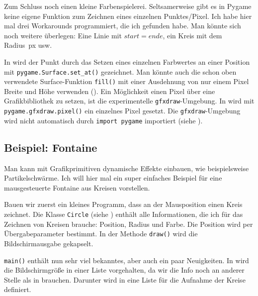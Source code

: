 Zum Schluss noch einen kleine Farbenspielerei. Seltsamerweise gibt es in Pygame keine eigene Funktion zum Zeichnen eines einzelnen Punktes/Pixel. Ich habe hier mal drei Workarounds programmiert, die ich gefunden habe. Man könnte sich noch weitere überlegen: Eine Linie mit $start=ende$, ein Kreis mit dem Radius~\unit[1]{px} usw.

In  wird der Punkt durch das Setzen eines einzelnen Farbwertes an einer Position mit \texttt{pygame.Surface.set\_at()} gezeichnet. Man könnte auch die schon oben verwendete Surface-Funktion \texttt{fill()} mit einer Ausdehnung von nur einem Pixel Breite und Höhe verwenden (). Ein Möglichkeit einen Pixel über eine Grafikbibliothek zu setzen, ist die experimentelle \texttt{gfxdraw}-Umgebung. In  wird mit \texttt{pygame.gfxdraw.pixel()} ein einzelnes Pixel gesetzt. Die \texttt{gfxdraw}-Umgebung wird nicht automatisch durch \texttt{import pygame} importiert (siehe ).

\subsection{Beispiel: Fontaine}

Man kann mit Grafikprimitiven dynamische Effekte einbauen, wie beispielsweise Partikelschwärme. Ich will hier mal ein super einfaches Beispiel für eine mausgesteuerte Fontaine aus Kreisen vorstellen.

\begin{figure}%
	\begin{center}%
		\vspace{-1cm}%
	\end{center}%
\end{figure}%
Bauen wir zuerst ein kleines Programm, dass an der Mausposition einen Kreis zeichnet. Die Klasse \texttt{Circle} (siehe ) enthält alle Informationen, die ich für das Zeichnen von Kreisen brauche: Position, Radius und Farbe. Die Position wird per Übergabeparameter bestimmt. In der Methode  \texttt{draw()} wird die Bildschirmausgabe gekapselt.

\texttt{main()} enthält nun sehr viel bekanntes, aber auch ein paar Neuigkeiten. In  wird die Bildschirmgröße in einer Liste vorgehalten, da wir die Info noch an anderer Stelle als in  brauchen. Darunter wird in  eine Liste für die Aufnahme der Kreise definiert. 

